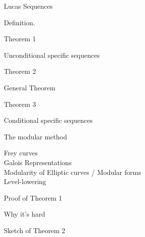 \documentclass[pdf]{beamer}
\begin{document}
\begin{frame}{Lucas Sequences}

Definition.

\end{frame}

\begin{frame}{Theorem 1}

\begin{theorem}
Unconditional specific sequences

\end{theorem}


\end{frame}

\begin{frame}{Theorem 2}

\begin{theorem}
General Theorem

\end{theorem}


\end{frame}

\begin{frame}{Theorem 3}

\begin{theorem}
Conditional specific sequences

\end{theorem}


\end{frame}

\begin{frame}{The modular method}

Frey curves \\

Galois Representations \\

Modularity of Elliptic curves / Modular forms \\

Level-lowering

\end{frame}


\begin{frame}{Proof of Theorem 1}


\end{frame}

\begin{frame}{Why it's hard}


\end{frame}


\begin{frame}{Sketch of Theorem 2}

\end{frame}
\end{document}
